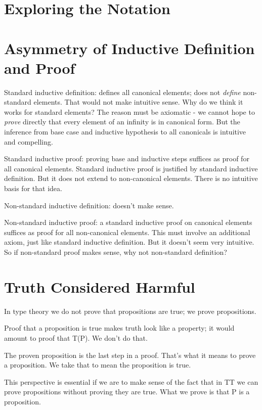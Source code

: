 \documentclass{article}
\begin{document}
\large

\section{Exploring the Notation}


\section{Asymmetry of Inductive Definition and Proof}

Standard inductive definition: defines all canonical elements; does
not \emph{define} non-standard elements.  That would not make
intuitive sense.  Why do we think it works for standard elements?  The
reason must be axiomatic - we cannot hope to \emph{prove} directly
that every element of an infinity is in canonical form.  But the
inference from base case and inductive hypothesis to all canonicals is
intuitive and compelling.

Standard inductive proof: proving base and inductive steps suffices as
proof for all canonical elements.  Standard inductive proof is
justified by standard inductive definition.  But it does not extend to
non-canonical elements.  There is no intuitive basis for that idea.

Non-standard inductive definition:  doesn't make sense.

Non-standard inductive proof: a standard inductive proof on canonical
elements suffices as proof for all non-canonical elements.  This must
involve an additional axiom, just like standard inductive definition.
But it doesn't seem very intuitive.  So if non-standard proof makes
sense, why not non-standard definition?

\section{Truth Considered Harmful}

In type theory we do not prove that propositions are true; we prove propositions.

Proof that a proposition is true makes truth look like a property; it
would amount to proof that T(P).  We don't do that.

The proven proposition is the last step in a proof.  That's what it
means to prove a proposition.  We take that to mean the proposition is true.

This perspective is essential if we are to make sense of the fact that
in TT we can prove propositions without proving they are true.  What
we prove is that P is a proposition.
\end{document}

